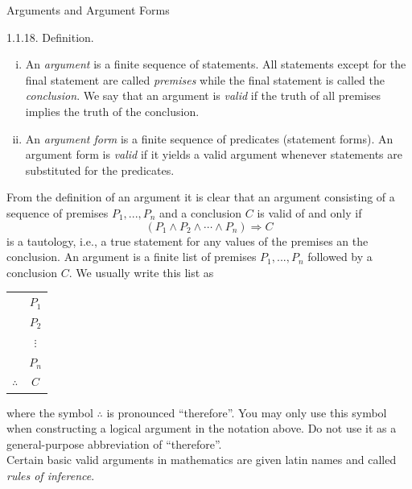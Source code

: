 \documentclass[smaller,hyperref={CJKbookmarks=true}]{beamer}
\begin{document}
\begin{frame}{Arguments and Argument Forms}
\begin{spacing}{1.05}
\alert{1.1.18. Definition.}
\begin{enumerate}[(i)]
  \item An \emph{argument} is a finite sequence of statements. All statements
      except for the final statement are called \emph{premises} while the final
      statement is called the \emph{conclusion}. We say that an argument is \emph{valid}
      if the truth of all premises implies the truth of the conclusion.
  \item An \emph{argument form} is a finite sequence of predicates (statement
      forms). An argument form is \emph{valid} if it yields a valid argument
      whenever statements are substituted for the predicates.
\end{enumerate}
From the definition of an argument it is clear that an argument consisting
of a sequence of premises $P_1,...,P_n$ and a conclusion $C$ is valid of and only if
\begin{equation}\label{1.1.3}
  (P_1\wedge P_2\wedge\cdots\wedge P_n)\Rightarrow C
\end{equation}
is a tautology, i.e., a true statement for any values of the premises an the
conclusion.
\newpage
An argument is a finite list of premises $P_1,...,P_n$ followed by a conclusion $C$. We usually write this list as
\begin{center}
  \begin{tabular}{cc}
      & $P_1$ \\
      & $P_2$ \\
      & $\vdots$ \\
      & $P_n$ \\[3pt] \cmidrule{2-2}
    $\therefore$ & $C$  \\
  \end{tabular}
\end{center}
where the symbol $\therefore$ is pronounced ``therefore''. You may only use this
symbol when constructing a logical argument in the notation above. Do
not use it as a general-purpose abbreviation of ``therefore''.\\[5pt]
Certain basic valid arguments in mathematics are given latin names and
called \emph{rules of inference}.
\end{spacing}
\end{frame}
\end{document}
